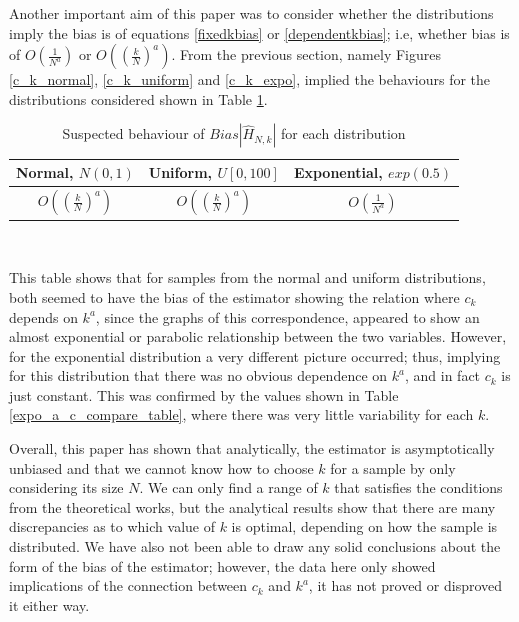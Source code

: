 \documentclass[12pt]{report}
\begin{document}
Another important aim of this paper was to consider whether the distributions imply the bias is of equations \ref{fixedkbias} or \ref{dependentkbias}; i.e, whether bias is of $O \left( \frac{1}{N^{a}} \right)$ or $O\left( \left( \frac{k}{N} \right)^{a} \right)$. From the previous section, namely Figures \ref{c_k_normal}, \ref{c_k_uniform} and \ref{c_k_expo}, implied the behaviours for the distributions considered shown in Table \ref{distribution_comparison}.

\begin{table}
\caption{Suspected behaviour of $Bias |\hat{H}_{N, k} |$ for each distribution} \label{distribution_comparison}
\begin{center}
\begin{tabular}{| c | c | c|} 
\toprule
Normal, $N(0,1)$ & Uniform, $U[0,100]$ & Exponential, $exp(0.5)$ \\
\midrule[1pt]
$O\left( \left( \frac{k}{N} \right)^{a} \right)$ & $O\left( \left( \frac{k}{N} \right)^{a} \right)$ &  $O \left( \frac{1}{N^{a}} \right)$ \\
\hline
\end{tabular}
\\[10pt]
\end{center}
\end{table}

This table shows that for samples from the normal and uniform distributions, both seemed to have the bias of the estimator showing the relation where $c_{k}$ depends on $k^a$, since the graphs of this correspondence, appeared to show an almost exponential or parabolic relationship between the two variables. However, for the exponential distribution a very different picture occurred; thus, implying for this distribution that there was no obvious dependence on $k^a$, and in fact $c_{k}$ is just constant. This was confirmed by the values shown in Table \ref{expo_a_c_compare_table}, where there was very little variability for each $k$.

Overall, this paper has shown that analytically, the estimator is asymptotically unbiased and that we cannot know how to choose $k$ for a sample by only considering its size $N$. We can only find a range of $k$ that satisfies the conditions from the theoretical works, but the analytical results show that there are many discrepancies as to which value of $k$ is optimal, depending on how the sample is distributed. We have also not been able to draw any solid conclusions about the form of the bias of the estimator; however, the data here only showed implications of the connection between $c_{k}$ and $k^a$, it has not proved or disproved it either way.
\end{document}
